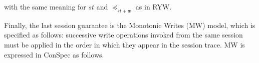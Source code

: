 \documentclass[acmlarge, ,11pt]{acmart}
\begin{document}
\begin{align}
\begin{split}
\end{split}
  \end{align} %
with the same meaning for $\mathit{st}$ and $\preccurlyeq_{\mathit{st}+w}$ as in RYW.
 \par Finally, the last session guarantee is the Monotonic Writes (MW) model, which is specified as follows: successive write operations invoked from the same session must be applied in the order in which they appear in the session trace.  MW is expressed in ConSpec as follows.
\end{document}
